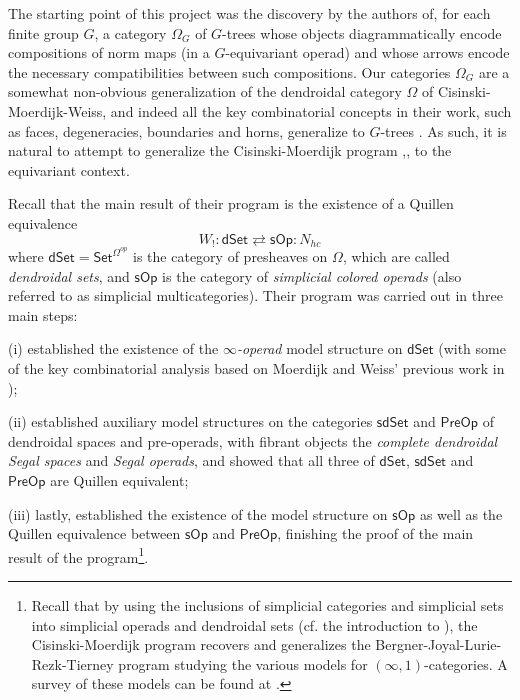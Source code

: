 \documentclass[a4paper,10pt
 ,draft
]{article}%
\begin{document}
The starting point of this project was the discovery by the authors of,
for each finite group $G$,
a category $\Omega_G$ of $G$-trees whose objects diagrammatically encode compositions of norm maps 
(in a $G$-equivariant operad)
and whose arrows encode the necessary compatibilities between such compositions.
Our categories $\Omega_G$ are a somewhat non-obvious  generalization of the dendroidal category $\Omega$
of Cisinski-Moerdijk-Weiss, 
and indeed all the key combinatorial concepts in their work,
such as faces, degeneracies, boundaries and horns, generalize to $G$-trees \cite[\S 5,\S 6]{Per18}.
As such, it is natural to attempt to generalize the 
Cisinski-Moerdijk program \cite{CM11},\cite{CM13a},\cite{CM13b} to the equivariant context. 

Recall that the main result of their program is the existence of a Quillen equivalence
\[
	W_{!} \colon \mathsf{dSet} 
		\rightleftarrows
	\mathsf{sOp}  \colon N_{hc} 
\]
where $\mathsf{dSet} = \mathsf{Set}^{\Omega^{op}} $
is the category of presheaves on $\Omega$, 
which are called \textit{dendroidal sets},
and 
$\mathsf{sOp}$ is the category of \textit{simplicial colored operads} (also referred to as simplicial multicategories).
Their program was carried out in three main steps:
\begin{inparaenum}
	\item[(i)] \cite{CM11} established the existence of the \textit{$\infty$-operad} model structure on $\mathsf{dSet}$ 
	(with some of the key combinatorial analysis based on Moerdijk and Weiss' previous work in \cite{MW09});
	\item[(ii)] \cite{CM13a} established auxiliary model structures on the categories $\mathsf{sdSet}$ and $\mathsf{PreOp}$
              of dendroidal spaces and pre-operads, with fibrant objects the \textit{complete dendroidal Segal spaces} and \textit{Segal operads},
              and showed that all three of $\mathsf{dSet}$, $\mathsf{sdSet}$ and $\mathsf{PreOp}$ are Quillen equivalent;
	\item[(iii)] lastly, \cite{CM13b} established the existence of the model structure on $\mathsf{sOp}$ as well as the Quillen equivalence between $\mathsf{sOp}$ and $\mathsf{PreOp}$, finishing the proof of the main result of the program\footnote{Recall that by using the inclusions of simplicial categories and simplicial sets into simplicial operads and dendroidal sets (cf. the introduction to \cite{CM13b}), the Cisinski-Moerdijk program recovers and generalizes the Bergner-Joyal-Lurie-Rezk-Tierney program studying the various models for $(\infty,1)$-categories. A survey of these models can be found at \cite{Ber10}.}.
\end{inparaenum}
\end{document}
